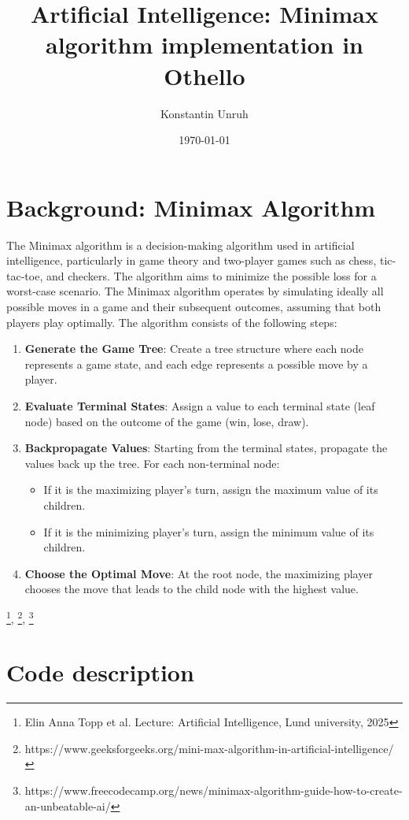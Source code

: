 \documentclass[a4paper,12pt]{article}
\title{Artificial Intelligence: Minimax algorithm implementation in Othello}
\author{Konstantin Unruh}
\date{\today}
\begin{document}
\maketitle


\section{Background: Minimax Algorithm}
The Minimax algorithm is a decision-making algorithm used in artificial intelligence, particularly in game theory and two-player games such as chess, tic-tac-toe, and checkers. The algorithm aims to minimize the possible loss for a worst-case scenario. The Minimax algorithm operates by simulating ideally all possible moves in a game and their subsequent outcomes, assuming that both players play optimally. The algorithm consists of the following steps:

\begin{enumerate}
    \item \textbf{Generate the Game Tree}: Create a tree structure where each node represents a game state, and each edge represents a possible move by a player.
    \item \textbf{Evaluate Terminal States}: Assign a value to each terminal state (leaf node) based on the outcome of the game (win, lose, draw).
    \item \textbf{Backpropagate Values}: Starting from the terminal states, propagate the values back up the tree. For each non-terminal node:
    \begin{itemize}
        \item If it is the maximizing player's turn, assign the maximum value of its children.
        \item If it is the minimizing player's turn, assign the minimum value of its children.
    \end{itemize}
    \item \textbf{Choose the Optimal Move}: At the root node, the maximizing player chooses the move that leads to the child node with the highest value.
\end{enumerate}

\footnote{Elin Anna Topp et al. Lecture: Artificial Intelligence, Lund university, 2025}, \footnote{https://www.geeksforgeeks.org/mini-max-algorithm-in-artificial-intelligence/}, \footnote{https://www.freecodecamp.org/news/minimax-algorithm-guide-how-to-create-an-unbeatable-ai/}

\section{Code description}
\end{document}
